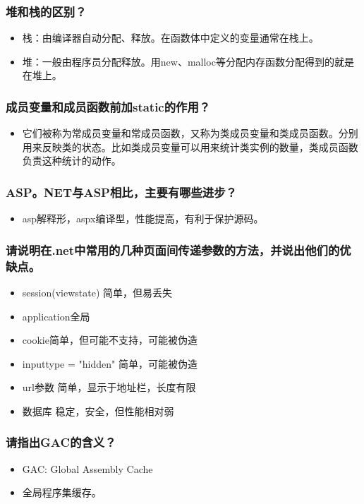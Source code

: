 \documentclass[9pt, b5paper]{article}
\begin{document}
\subsubsection{堆和栈的区别？}
\label{sec-1-1-54}
\begin{itemize}
\item 栈：由编译器自动分配、释放。在函数体中定义的变量通常在栈上。
\item 堆：一般由程序员分配释放。用new、malloc等分配内存函数分配得到的就是在堆上。
\end{itemize}
\subsubsection{成员变量和成员函数前加static的作用？}
\label{sec-1-1-55}
\begin{itemize}
\item 它们被称为常成员变量和常成员函数，又称为类成员变量和类成员函数。分别用来反映类的状态。比如类成员变量可以用来统计类实例的数量，类成员函数负责这种统计的动作。
\end{itemize}
\subsubsection{ASP。NET与ASP相比，主要有哪些进步？}
\label{sec-1-1-56}
\begin{itemize}
\item asp解释形，aspx编译型，性能提高，有利于保护源码。
\end{itemize}
\subsubsection{请说明在.net中常用的几种页面间传递参数的方法，并说出他们的优缺点。}
\label{sec-1-1-57}
\begin{itemize}
\item session(viewstate) 简单，但易丢失
\item application全局
\item cookie简单，但可能不支持，可能被伪造
\item inputtype = "hidden" 简单，可能被伪造
\item url参数 简单，显示于地址栏，长度有限
\item 数据库 稳定，安全，但性能相对弱
\end{itemize}
\subsubsection{请指出GAC的含义？}
\label{sec-1-1-58}
\begin{itemize}
\item GAC: Global Assembly Cache
\item 全局程序集缓存。
\end{itemize}
\end{document}
